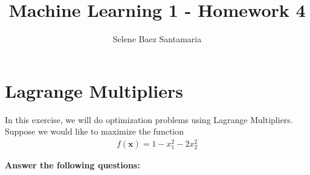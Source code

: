 \documentclass[12pt,a4paper]{article}
\title{Machine Learning 1 - Homework 4}
\author{Selene Baez Santamaria}
\date{}
\begin{document}
\maketitle
{}
\titleformat{\subsection}[runin]{\normalsize\bfseries}{}{0pt}{#1 \thesubsection\newline}


\section{Lagrange Multipliers}

In this exercise, we will do optimization problems using Lagrange Multipliers. Suppose we would like to maximize the function
\begin{align}
  f(\mathbf{x}) = 1 - x_1^2 - 2x_2^2
\end{align}


{\bf Answer the following questions:}
\end{document}
